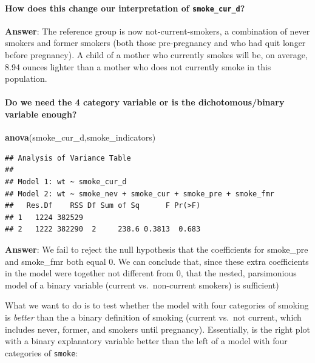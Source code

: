 \documentclass[]{article}
\newenvironment{Shaded}{\begin{snugshade}}{\end{snugshade}}
\newcommand{\KeywordTok}[1]{\textcolor[rgb]{0.13,0.29,0.53}{\textbf{#1}}}
\newcommand{\NormalTok}[1]{#1}
\let\oldparagraph\paragraph
\renewcommand{\paragraph}[1]{\oldparagraph{#1}\mbox{}}
\begin{document}
\hypertarget{how-does-this-change-our-interpretation-of-smoke_cur_d}{%
\paragraph{\texorpdfstring{How does this change our interpretation of
\texttt{smoke\_cur\_d}?}{How does this change our interpretation of smoke\_cur\_d?}}\label{how-does-this-change-our-interpretation-of-smoke_cur_d}}

\textbf{Answer}: The reference group is now not-current-smokers, a
combination of never smokers and former smokers (both those
pre-pregnancy and who had quit longer before pregnancy). A child of a
mother who currently smokes will be, on average, 8.94 ounces lighter
than a mother who does not currently smoke in this population.

\hypertarget{do-we-need-the-4-category-variable-or-is-the-dichotomousbinary-variable-enough}{%
\paragraph{Do we need the 4 category variable or is the
dichotomous/binary variable
enough?}\label{do-we-need-the-4-category-variable-or-is-the-dichotomousbinary-variable-enough}}

\begin{Shaded}
\begin{Highlighting}[]
\KeywordTok{anova}\NormalTok{(smoke_cur_d,smoke_indicators)}
\end{Highlighting}
\end{Shaded}

\begin{verbatim}
## Analysis of Variance Table
## 
## Model 1: wt ~ smoke_cur_d
## Model 2: wt ~ smoke_nev + smoke_cur + smoke_pre + smoke_fmr
##   Res.Df    RSS Df Sum of Sq      F Pr(>F)
## 1   1224 382529                           
## 2   1222 382290  2     238.6 0.3813  0.683
\end{verbatim}

\textbf{Answer}: We fail to reject the null hypothesis that the
coefficients for smoke\_pre and smoke\_fmr both equal 0. We can conclude
that, since these extra coefficients in the model were together not
different from 0, that the nested, parsimonious model of a binary
variable (current vs.~non-current smokers) is sufficient)

What we want to do is to test whether the model with four categories of
smoking is \emph{better} than the a binary definition of smoking
(current vs.~not current, which includes never, former, and smokers
until pregnancy). Essentially, is the right plot with a binary
explanatory variable better than the left of a model with four
categories of \texttt{smoke}:
\end{document}
